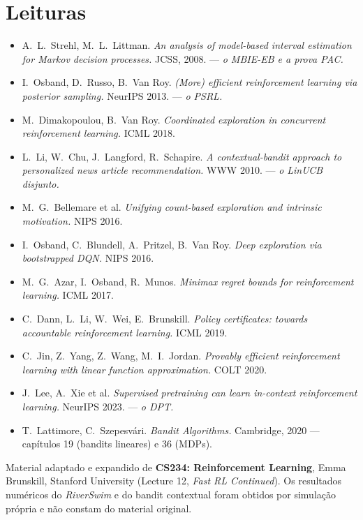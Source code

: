 \documentclass[11pt, a4paper]{article}
\begin{document}
\section{Leituras}

\begin{itemize}\setlength{\itemsep}{0.05em}
  \item A.\ L.\ Strehl, M.\ L.\ Littman. \textit{An analysis of model-based interval
        estimation for Markov decision processes.} JCSS, 2008. --- \emph{o MBIE-EB e a
        prova PAC.}
  \item I.\ Osband, D.\ Russo, B.\ Van Roy. \textit{(More) efficient reinforcement
        learning via posterior sampling.} NeurIPS 2013. --- \emph{o PSRL.}
  \item M.\ Dimakopoulou, B.\ Van Roy. \textit{Coordinated exploration in concurrent
        reinforcement learning.} ICML 2018.
  \item L.\ Li, W.\ Chu, J.\ Langford, R.\ Schapire. \textit{A contextual-bandit approach
        to personalized news article recommendation.} WWW 2010. --- \emph{o LinUCB
        disjunto.}
  \item M.\ G.\ Bellemare et al. \textit{Unifying count-based exploration and intrinsic
        motivation.} NIPS 2016.
  \item I.\ Osband, C.\ Blundell, A.\ Pritzel, B.\ Van Roy. \textit{Deep exploration via
        bootstrapped DQN.} NIPS 2016.
  \item M.\ G.\ Azar, I.\ Osband, R.\ Munos. \textit{Minimax regret bounds for
        reinforcement learning.} ICML 2017.
  \item C.\ Dann, L.\ Li, W.\ Wei, E.\ Brunskill. \textit{Policy certificates: towards
        accountable reinforcement learning.} ICML 2019.
  \item C.\ Jin, Z.\ Yang, Z.\ Wang, M.\ I.\ Jordan. \textit{Provably efficient
        reinforcement learning with linear function approximation.} COLT 2020.
  \item J.\ Lee, A.\ Xie et al. \textit{Supervised pretraining can learn in-context
        reinforcement learning.} NeurIPS 2023. --- \emph{o DPT.}
  \item T.\ Lattimore, C.\ Szepesvári. \textit{Bandit Algorithms.} Cambridge, 2020 ---
        capítulos 19 (bandits lineares) e 36 (MDPs).
\end{itemize}

\vspace{0.6em}
{\footnotesize\color{rlCinza}
Material adaptado e expandido de \textbf{CS234: Reinforcement Learning}, Emma Brunskill,
Stanford University (Lecture 12, \textit{Fast RL Continued}). Os resultados numéricos do
\textit{RiverSwim} e do bandit contextual foram obtidos por simulação própria e não
constam do material original.}
\end{document}
